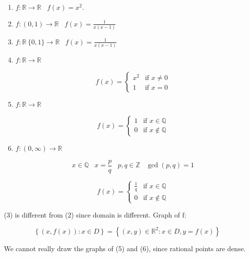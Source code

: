 \documentclass[12pt]{scrbook}
\begin{document}
\begin{enumerate}
	\item
	 $ f : \mathbb{R} \rightarrow \mathbb{R} \;\;\; f(x) = x^2 $.

	\item 
	$f : (0, 1)  \rightarrow \mathbb{R} \;\;\; f(x) = \frac{1}{x(x-1)} $

	\item 
	$f : \mathbb{R} \ \{0,1\} \rightarrow \mathbb{R} \;\;\; f(x) = \frac{1}{x(x-1)} $
	
	\item 
	$f : \mathbb{R} \rightarrow \mathbb{R} $
	
	\[ 
	f(x) = \left\{ \begin{array}{ll}
         x^2 & \mbox{if $x \neq 0$} \\
        1 & \mbox{if $x = 0$}
         \end{array} 
         \right. 
         \] 
         
         \item
         $f : \mathbb{R} \rightarrow \mathbb{R} $
         
         	\[ 
	f(x) = \left\{ \begin{array}{ll}
         1 & \mbox{if $x \in \mathbb{Q} $} \\
         0 & \mbox{if $x \notin \mathbb{Q} $}
         \end{array} 
         \right. 
         \] 
	
	\item
         $f : (0, \infty) \rightarrow \mathbb{R} $
         
         \[ x \in \mathbb{Q} \;\;\; x = \frac{p}{q} \;\;\; p, q \in \mathbb{Z} \;\;\; \gcd(p, q) = 1 \] 
         
         	\[ 
	f(x) = \left\{ \begin{array}{ll}
         \frac{1}{q} & \mbox{if $x \in \mathbb{Q} $} \\
         0 & \mbox{if $x \notin \mathbb{Q} $}
         \end{array} 
         \right. 
         \] 

\end{enumerate}

(3) is different from (2) since domain is different. Graph of f:

\[ \left\{ (x, f(x)) : x \in D \right\}  =  \left\{ (x, y) \in \mathbb{R}^2 :  x \in D, y = f(x) \right\} \]

We cannot really draw the graphs of (5) and (6), since rational points are dense.
\end{document}
